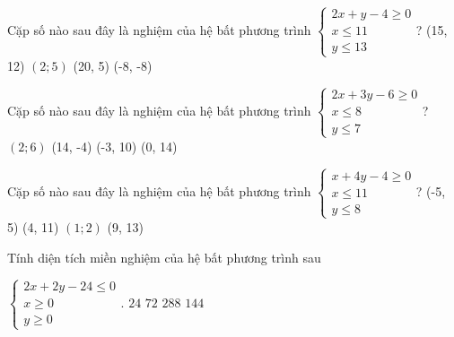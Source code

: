 \begin{ex}
 Cặp số nào sau đây là nghiệm của hệ bất phương trình $\left\{ \begin{array}{l} 
    2 x + y - 4 \ge 0\\ 
    x\le 11\\ 
    y \le 13
    \end{array} \right.$? 
\choice
{ (15, 12) }
   { \True $(2;5)$ }
     { (20, 5) }
    { (-8, -8) }
\end{ex}

\begin{ex}
 Cặp số nào sau đây là nghiệm của hệ bất phương trình $\left\{ \begin{array}{l} 
    2 x + 3 y - 6 \ge 0\\ 
    x\le 8\\ 
    y \le 7
    \end{array} \right.$? 
\choice
{ \True $(2;6)$ }
   { (14, -4) }
     { (-3, 10) }
    { (0, 14) }
\end{ex}

\begin{ex}
 Cặp số nào sau đây là nghiệm của hệ bất phương trình $\left\{ \begin{array}{l} 
    x + 4 y - 4 \ge 0\\ 
    x\le 11\\ 
    y \le 8
    \end{array} \right.$? 
\choice
{ (-5, 5) }
   { (4, 11) }
     { \True $(1;2)$ }
    { (9, 13) }
\end{ex}

\begin{ex}
 Tính diện tích miền nghiệm của hệ bất phương trình sau

 $\left\{ \begin{array}{l} 
        2 x + 2 y - 24 \le 0\\ 
        x\ge 0\\ 
        y \ge 0
        \end{array} \right.$. 
\choice
{ ${24}$ }
   { \True ${72}$ }
     { ${288}$ }
    { ${144}$ }
\end{ex}

